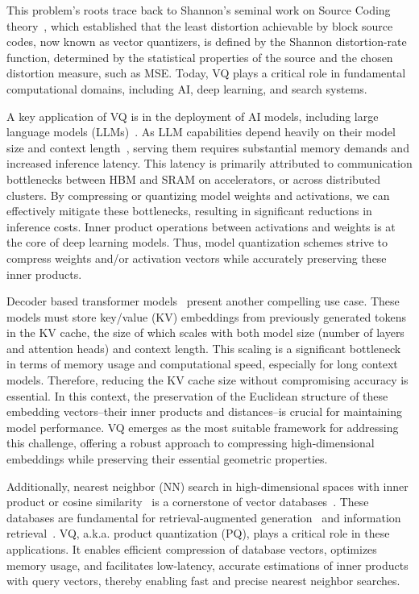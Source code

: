 \documentclass[11pt]{article}
\begin{document}
This problem's roots trace back to Shannon’s seminal work on Source Coding theory~\cite{shannon1948mathematical, shannon1959coding}, which established that the least distortion achievable by block source codes, now known as vector quantizers, is defined by the Shannon distortion-rate function, determined by the statistical properties of the source and the chosen distortion measure, such as MSE. 
Today, VQ plays a critical role in fundamental computational domains, including AI, deep learning, and search systems.


A key application of VQ is in the deployment of AI models, including large language models (LLMs)~\cite{achiam2023gpt, dubey2024llama, claude, team2024gemini}. 
As LLM capabilities depend heavily on their model size and context length~\cite{kaplan2020scaling}, serving them requires substantial memory demands and increased inference latency. 
This latency is primarily attributed to communication bottlenecks between HBM and SRAM on accelerators, or across distributed clusters. 
By compressing or quantizing model weights and activations, we can effectively mitigate these bottlenecks, resulting in significant reductions in inference costs. 
Inner product operations between activations and weights is at the core of deep learning models. 
Thus, model quantization schemes strive to compress weights and/or activation vectors while accurately preserving these inner products.


Decoder based transformer models~\cite{vaswani2017attention} present another compelling use case.
These models must store key/value (KV) embeddings from previously generated tokens in the KV cache, the size of which scales with both model size (number of layers and attention heads) and context length. 
This scaling is a significant bottleneck in terms of memory usage and computational speed, especially for long context models. 
Therefore, reducing the KV cache size without compromising accuracy is essential.
In this context, the preservation of the Euclidean structure of these embedding vectors--their inner products and distances--is crucial for maintaining model performance. 
VQ emerges as the most suitable framework for addressing this challenge, offering a robust approach to compressing high-dimensional embeddings while preserving their essential geometric properties.


Additionally, nearest neighbor (NN) search in high-dimensional spaces with inner product or cosine similarity~\cite{elasticsearch, guo2020accelerating} is a cornerstone of vector databases~\cite{pinecone, gdrant, pgvector}.
These databases are fundamental for retrieval-augmented generation~\cite{gao2023retrieval, edge2024local} and information retrieval~\cite{khattab2020colbert, santhanam2021colbertv2}. 
VQ, a.k.a. product quantization (PQ), plays a critical role in these applications. 
It enables efficient compression of database vectors, optimizes memory usage, and facilitates low-latency, accurate estimations of inner products with query vectors, thereby enabling fast and precise nearest neighbor searches.
\end{document}

